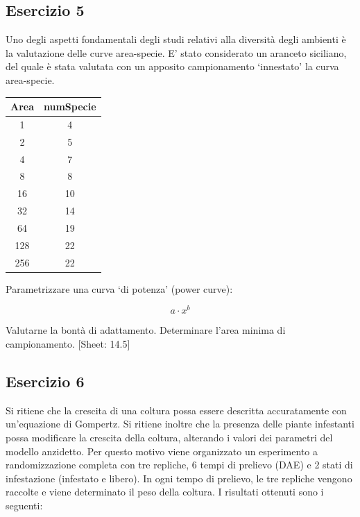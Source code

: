 \documentclass[a4paper,12pt,oneside]{book}
\begin{document}
\hypertarget{esercizio-5-6}{%
\subsection{Esercizio 5}\label{esercizio-5-6}}

Uno degli aspetti fondamentali degli studi relativi alla diversità degli ambienti è la valutazione delle curve area-specie. E' stato considerato un aranceto siciliano, del quale è stata valutata con un apposito campionamento `innestato' la curva area-specie.

\begin{longtable}[]{@{}cc@{}}
\toprule()
Area & numSpecie \\
\midrule()
\endhead
1 & 4 \\
2 & 5 \\
4 & 7 \\
8 & 8 \\
16 & 10 \\
32 & 14 \\
64 & 19 \\
128 & 22 \\
256 & 22 \\
\bottomrule()
\end{longtable}

Parametrizzare una curva `di potenza' (power curve):

\[a \cdot x^b\]

Valutarne la bontà di adattamento. Determinare l'area minima di campionamento.
{[}Sheet: 14.5{]}

\hypertarget{esercizio-6-3}{%
\subsection{Esercizio 6}\label{esercizio-6-3}}

Si ritiene che la crescita di una coltura possa essere descritta accuratamente con un'equazione di Gompertz. Si ritiene inoltre che la presenza delle piante infestanti possa modificare la crescita della coltura, alterando i valori dei parametri del modello anzidetto. Per questo motivo viene organizzato un esperimento a randomizzazione completa con tre repliche, 6 tempi di prelievo (DAE) e 2 stati di infestazione (infestato e libero). In ogni tempo di prelievo, le tre repliche vengono raccolte e viene determinato il peso della coltura. I risultati ottenuti sono i seguenti:
\end{document}
